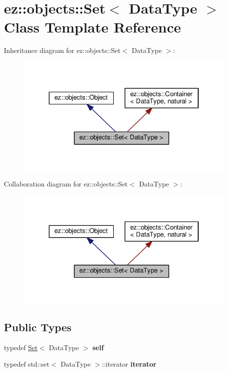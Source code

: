 \hypertarget{classez_1_1objects_1_1Set}{}\section{ez\+:\+:objects\+:\+:Set$<$ Data\+Type $>$ Class Template Reference}
\label{classez_1_1objects_1_1Set}


Inheritance diagram for ez\+:\+:objects\+:\+:Set$<$ Data\+Type $>$\+:
\nopagebreak
\begin{figure}[H]
\begin{center}
\leavevmode
\includegraphics[width=310pt]{classez_1_1objects_1_1Set__inherit__graph}
\end{center}
\end{figure}


Collaboration diagram for ez\+:\+:objects\+:\+:Set$<$ Data\+Type $>$\+:
\nopagebreak
\begin{figure}[H]
\begin{center}
\leavevmode
\includegraphics[width=310pt]{classez_1_1objects_1_1Set__coll__graph}
\end{center}
\end{figure}
\subsection*{Public Types}
\begin{DoxyCompactItemize}
\item 
\mbox{\label{classez_1_1objects_1_1Set_af268f1b4453b28e81e7338e84abc6cc8}} 
typedef \hyperlink{classez_1_1objects_1_1Set}{Set}$<$ Data\+Type $>$ {\bfseries self}
\item 
\mbox{\label{classez_1_1objects_1_1Set_a5e10b3a2e56eeeb1ed005d32c41c96ed}} 
typedef std\+::set$<$ Data\+Type $>$\+::iterator {\bfseries iterator}
\end{DoxyCompactItemize}

